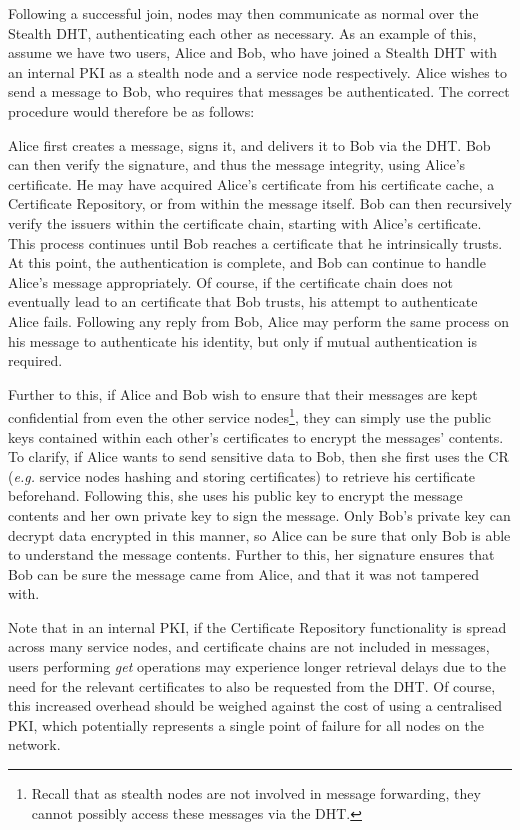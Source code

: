 \documentclass[times, 10pt,twocolumn]{article}
\begin{document}
\label{subsect-communicate}

Following a successful join, nodes may then communicate as normal over
the Stealth DHT, authenticating each other as necessary. As an example
of this, assume we have two users, Alice and Bob, who have joined a
Stealth DHT with an internal PKI as a stealth node and a service node
respectively. Alice wishes to send a message to Bob, who requires that
messages be authenticated. The correct procedure would therefore be as
follows:

Alice first creates a message, signs it, and delivers it to Bob via the
DHT. Bob can then verify the signature, and thus the message integrity,
using Alice's certificate. He may have acquired Alice's certificate
from his certificate cache, a Certificate Repository, or from within
the message itself. Bob can then recursively verify the issuers within
the certificate chain, starting with Alice's certificate. This process
continues until Bob reaches a certificate that he intrinsically trusts.
At this point, the authentication is complete, and Bob can continue to
handle Alice's message appropriately. Of course, if the certificate
chain does not eventually lead to an certificate that Bob trusts, his
attempt to authenticate Alice fails. Following any reply from Bob,
Alice may perform the same process on his message to authenticate his
identity, but only if mutual authentication is required.

Further to this, if Alice and Bob wish to ensure that their messages
are kept confidential from even the other service nodes\footnote{Recall
that as stealth nodes are not involved in message forwarding, they
cannot possibly access these messages via the DHT.}, they can simply
use the public keys contained within each other's certificates to
encrypt the messages' contents. To clarify, if Alice wants to send
sensitive data to Bob, then she first uses the CR (\emph{e.g.} service
nodes hashing and storing certificates) to retrieve his certificate
beforehand. Following this, she uses his public key to encrypt the
message contents and her own private key to sign the message. Only
Bob's private key can decrypt data encrypted in this manner, so Alice
can be sure that only Bob is able to understand the message contents.
Further to this, her signature ensures that Bob can be sure the message
came from Alice, and that it was not tampered with.

Note that in an internal PKI, if the Certificate Repository
functionality is spread across many service nodes, and certificate
chains are not included in messages, users performing \emph{get}
operations may experience longer retrieval delays due to the need for
the relevant certificates to also be requested from the DHT. Of course,
this increased overhead should be weighed against the cost of using a
centralised PKI, which potentially represents a single point of failure
for all nodes on the network.
\end{document}
